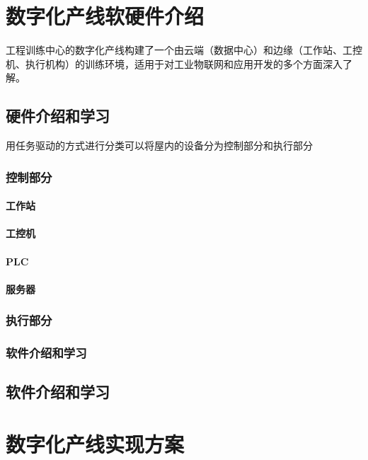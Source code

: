 \section{数字化产线软硬件介绍}
工程训练中心的数字化产线构建了一个由云端（数据中心）和边缘（工作站、工控机、执行机构）的训练环境，适用于对工业物联网和应用开发的多个方面深入了解。
\subsection{硬件介绍和学习}
用任务驱动的方式进行分类可以将屋内的设备分为控制部分和执行部分
\subsubsection{控制部分}

\paragraph{工作站}

\paragraph{工控机}

\paragraph{PLC}

\paragraph{服务器}

\subsubsection{执行部分}


\subsubsection{软件介绍和学习}

\subsection{软件介绍和学习}

\section{数字化产线实现方案}

